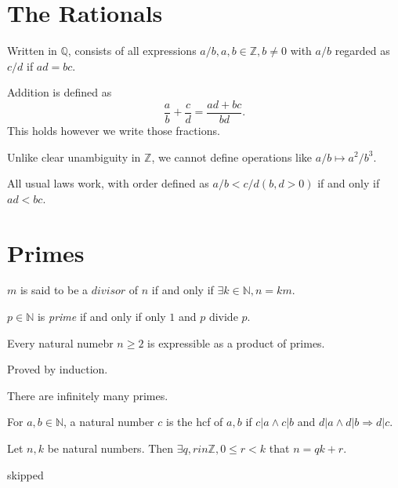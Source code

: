 \documentclass[10pt]{article}
\renewcommand{\ge}{\geqslant}
\renewcommand{\le}{\leqslant}
\begin{document}
	\section{The Rationals}
	Written in $ \mathbb{Q} $, consists of all expressions $ a/b, a,b\in \mathbb{Z}, b\neq 0 $ with $ a/b $ regarded as $ c/d $ if $ad=bc$.

	Addition is defined as 
	\[
		\frac{a}{b}+\frac{c}{d} = \frac{ad+bc}{bd}
	.\]
	This holds however we write those fractions.
	\begin{remark}
		Unlike clear unambiguity in $\mathbb{Z}$, we cannot define operations like $ a/b\mapsto a^2/b^3 $.
	\end{remark}

	All usual laws work, with order defined as $ a/b<c/d(b,d>0) $ if and only if $ ad<bc $.

	\section{Primes}
	\begin{definition}
		$m$ is said to be a $divisor$ of $n$ if and only if $\exists k\in \mathbb{N} , n=km$.

		$ p\in \mathbb{N} $ is \textit{prime} if and only if only $1$ and $p$ divide $p$.
	\end{definition}
	\begin{proposition}\label{prop:factor_into_primes}
		Every natural numebr $n\ge 2$ is expressible as a product of primes.
	\end{proposition}
	Proved by induction.
	\begin{theorem}\label{thm:infinite_primes}
		There are infinitely many primes.
	\end{theorem}
	\begin{definition}
		For $ a,b\in \mathbb{N}  $, a natural number $c$ is the hcf of $a,b$ if $ c|a \land c|b $ and $ d|a \land d|b \Rightarrow d|c $.
	\end{definition}
	\begin{proposition}\label{prop:division_alg}
		Let $ n,k $ be natural numbers. Then $ \exists q,r in \mathbb{Z} , 0\le r<k $ that $ n=qk+r $.
	\end{proposition}
	\begin{theorem}\label{thm:Euclid algorithm}
		skipped
	\end{theorem}
\end{document}
